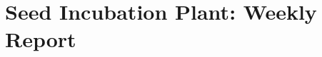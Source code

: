 \newcommand\fillTblCellHeight[0] {
    \draw
    (tmpNameNode.north |- origin) coordinate (end)
    (tmpNameNode.north) coordinate (start)
    ;

    \calcLength(start,end) {tblNameHeight}

    \pgfmathsetmacro{\tmp}{\spaceLeft - \tblNameHeight - (7 * \tblSpace) - (7 * \tblCellPad)}
    \xdef\spaceLeft{\tmp}

    \pgfmathsetmacro{\tblCellIdealHeight}{\spaceLeft / 7}

    \xdef\dayCount{7}

    \foreach \date/\holiday/\pOne/\pTwo/\pThree/\pFour in \tblData {
        \tblDrawTestCellHeight{\pOne} {\pTwo} {\pThree} {\pFour}

        \ifthenelse{\lengthtest{\tblCellTestHeight pt > \tblCellIdealHeight pt}} {

            \pgfmathsetmacro{\tmp}{\spaceLeft - \tblCellTestHeight}
            \xdef\spaceLeft{\tmp}
            \pgfmathsetmacro{\tmp}{\dayCount - 1}
            \xdef\dayCount{\tmp}

            \pgfmathsetmacro{\tmp}{\spaceLeft / \dayCount}
            \xdef\tblCellIdealHeight{\tmp}

        } {
        }
    }

    \pgfmathsetmacro{\tmp}{\spaceLeft / \dayCount}
    \xdef\tblCellHeight{\tmp}
}




\chapter{Seed Incubation Plant: Weekly Report}
\vspace{-0.6cm}

